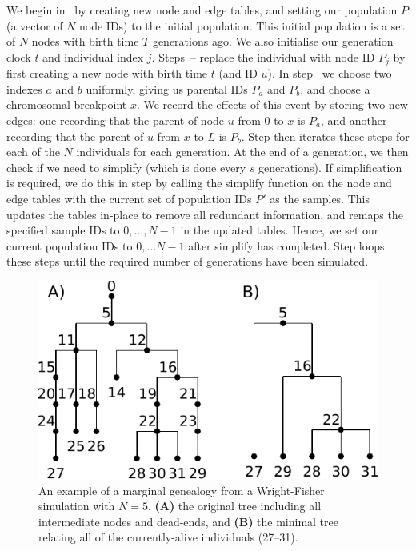 \documentclass{article}
\begin{document}
We begin in~ by creating new node and edge tables, and setting
our population $P$ (a vector of $N$ node IDs) to the initial population.
This initial population is a set of $N$ nodes with birth time $T$ generations
ago. We also initialise our generation clock $t$ and individual index $j$.
Steps~-- replace the individual with node ID
$P_j$ by first creating a new node with birth time $t$ (and ID $u$).
In step~ we choose two indexes $a$ and $b$ uniformly,
giving us parental IDs $P_a$ and $P_b$,
and choose a chromosomal breakpoint $x$.
We record the effects of this event by storing two new edges: one recording that the parent of node $u$
from $0$ to $x$ is $P_a$, and another recording that the parent of $u$
from $x$ to $L$ is $P_b$. Step  then iterates these steps
for each of the $N$ individuals for each generation.
At the end of a generation, we then check
if we need to simplify (which is done every $s$ generations).
If simplification is required, we do this in step  by calling the simplify function
on the node and edge tables with the current set of population IDs $P'$ as the samples.
This updates the tables in-place to remove all redundant
information, and remaps the specified sample IDs to $0, \dots, N - 1$ in the updated tables.
Hence, we set our current population IDs to
$0, \dots N - 1$ after simplify has completed.
Step  loops these steps until the required number of generations have been simulated.


\begin{figure}
    \begin{center}
        \includegraphics{wf-before-after}
    \end{center}
    \caption{An example of a marginal genealogy from a Wright-Fisher simulation
    with $N=5$. \textbf{(A)} the original tree including all
    intermediate nodes and dead-ends, and \textbf{(B)} the minimal tree
    relating all of the currently-alive individuals (27--31).
    \label{fig:wf-trees}
    }
\end{figure}
\end{document}
